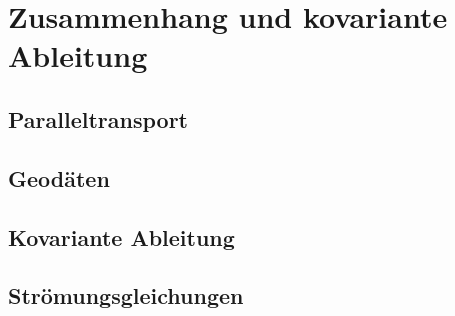 %
%
%
\chapter{Zusammenhang und kovariante Ableitung
\label{chapter:zusammenhang}}

\section{Paralleltransport}

\section{Geodäten}

\section{Kovariante Ableitung}

\section{Strömungsgleichungen}

